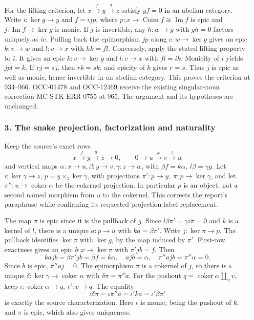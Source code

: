 \documentclass[11pt]{article}
\begin{document}
For the lifting criterion, let \(x\xrightarrow f y\xrightarrow g z\) satisfy \(gf=0\) in an abelian category. Write \(i:\ker g\to y\) and \(f=i j p\), where \(p:x\to\operatorname{Coim}f\cong\operatorname{Im}f\) is epic and \(j:\operatorname{Im}f\to\ker g\) is monic. If \(j\) is invertible, any \(h:w\to y\) with \(gh=0\) factors uniquely as \(ic\). Pulling back the epimorphism \(jp\) along \(c:w\to\ker g\) gives an epic \(k:v\to w\) and \(l:v\to x\) with \(hk=fl\). Conversely, apply the stated lifting property to \(i\). It gives an epic \(k:v\to\ker g\) and \(l:v\to x\) with \(fl=ik\). Monicity of \(i\) yields \(jpl=k\). If \(rj=sj\), then \(rk=sk\), and epicity of \(k\) gives \(r=s\). Thus \(j\) is epic as well as monic, hence invertible in an abelian category. This proves the criterion at 934--966. OCC-01478 and OCC-12469 receive the existing singular-noun correction MC-STK-ERR-0755 at 965. The argument and its hypotheses are unchanged.

\subsubsection{3. The snake projection, factorization and naturality}\label{the-snake-projection-factorization-and-naturality}

Keep the source's exact rows \[
x\xrightarrow f y\xrightarrow g z\to0,\qquad
0\to u\xrightarrow k v\xrightarrow l w
\] and vertical maps \(\alpha:x\to u,\beta:y\to v,\gamma:z\to w\), with \(\beta f=k\alpha,\ l\beta=\gamma g\). Let \(i:\ker\gamma\to z\), \(p=y\times_z\ker\gamma\), with projections \(\pi':p\to y,\ \pi:p\to\ker\gamma\), and let \(\pi'':u\to\operatorname{coker}\alpha\) be the cokernel projection. In particular \(p\) is an object, not a second named morphism from \(u\) to the cokernel. This corrects the report's paraphrase while confirming its requested projection-label replacement.

The map \(\pi\) is epic since it is the pullback of \(g\). Since \(l\beta\pi'=\gamma i\pi=0\) and \(k\) is a kernel of \(l\), there is a unique \(a:p\to u\) with \(ka=\beta\pi'\). Write \(j:\ker\pi\to p\). The pullback identifies \(\ker\pi\) with \(\ker g\), by the map induced by \(\pi'\). First-row exactness gives an epic \(b:x\to\ker\pi\) with \(\pi'jb=f\). Then \[
kajb=\beta\pi'jb=\beta f=k\alpha,\quad
ajb=\alpha,\quad \pi''ajb=\pi''\alpha=0.
\] Since \(b\) is epic, \(\pi''aj=0\). The epimorphism \(\pi\) is a cokernel of \(j\), so there is a unique \(\delta:\ker\gamma\to\operatorname{coker}\alpha\) with \(\delta\pi=\pi''a\). For the pushout \(q=\operatorname{coker}\alpha\amalg_u v\), keep \(\iota:\operatorname{coker}\alpha\to q,\ \iota':v\to q\). The equality \[
\iota\delta\pi=\iota\pi''a=\iota'ka=\iota'\beta\pi'
\] is exactly the source characterization. Here \(\iota\) is monic, being the pushout of \(k\), and \(\pi\) is epic, which also gives uniqueness.
\end{document}
